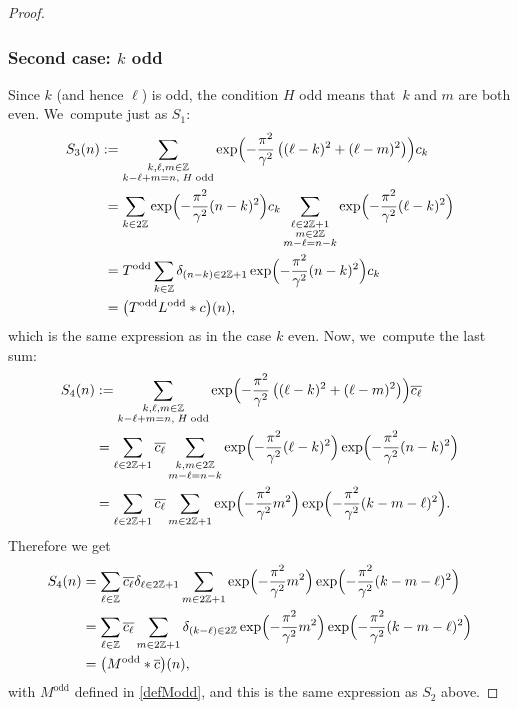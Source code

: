 \documentclass[10pt]{amsart}
\theoremstyle{definition}
\let\EE\exp
\let\ov\overline
\newcommand\Z{\mathbb Z}
\newcommand{\pa}[1]{\left(#1\right)}
\begin{document}
\begin{proof}
\subsubsection*{Second case: $k$ odd} Since $k$ (and hence $\ell$) is odd, the condition $H$ odd means that~$k$ and $m$ are both even. We~compute just as $S_1$:
\begin{align*}
S_3(n) &:= \sum_{\substack { k, \ell, m \in \Z \\ k-\ell+m=n, \;H\; \text{odd}}}\EE\Bigl(-\frac{\pi^2}{\gamma^2}\pa{(\ell-k)^2+(\ell-m)^2}\Bigr)c_{k} \\
&\hphantom{:}= \sum_{k\in 2\Z}\EE\Bigl(-\frac{\pi^2}{\gamma^2}(n-k)^2\Bigr)c_{k} \sum_{\substack {\ell \in 2\Z+1 \\ m \in 2\Z \\ m-\ell = n-k}}\EE\Bigl(-\frac{\pi^2}{\gamma^2}(\ell-k)^2\Bigr) \\
&\hphantom{:}= T^{\text{odd}}\sum_{k\in \Z}\delta_{(n-k)\in2\Z+1}\EE\Bigl(-\frac{\pi^2}{\gamma^2}(n-k)^2\Bigr)c_{k} \\
&\hphantom{:}= \bigl(T^{\text{odd}}L^{\text{odd}} * c\bigr)(n),
\end{align*}
which is the same expression as in the case $k$ even. Now, we~compute the last sum:
\begin{align*}
S_4(n) &:= \sum_{\substack {k, \ell, m \in \Z \\ k-\ell+m=n, \;H\; \text{odd}}}\EE\Bigl(-\frac{\pi^2}{\gamma^2}\pa{(\ell-k)^2+(\ell-m)^2}\Bigr)\ov{c_{\ell}} \\
&= \sum_{\ell\in 2\Z+1}\ov{c_{\ell}} \sum_{\substack {k,m \in 2\Z \\ m-\ell = n-k}}\EE\Bigl(-\frac{\pi^2}{\gamma^2}(\ell-k)^2\Bigr) \EE\Bigl(-\frac{\pi^2}{\gamma^2}(n-k)^2\Bigr) \\
&= \sum_{\ell\in 2\Z+1}\ov{c_{\ell}} \sum_{m \in 2\Z+1}\EE\Bigl(-\frac{\pi^2}{\gamma^2}m^2\Bigr) \EE\Bigl(-\frac{\pi^2}{\gamma^2}(k-m-\ell)^2\Bigr).
\end{align*}
Therefore we get
\begin{align*}
S_4(n) &= \sum_{\ell\in \Z}\ov{c_{\ell}}\delta_{\ell\in2\Z+1} \sum_{m \in 2\Z+1}\EE\Bigl(-\frac{\pi^2}{\gamma^2}m^2\Bigr)\EE\Bigl(-\frac{\pi^2}{\gamma^2}(k-m-\ell)^2\Bigr) \\
&= \sum_{\ell\in \Z}\ov{c_{\ell}} \sum_{m \in 2\Z+1}\delta_{(k-\ell)\in2\Z}\EE\Bigl(-\frac{\pi^2}{\gamma^2}m^2\Bigr) \EE\Bigl(-\frac{\pi^2}{\gamma^2}(k-m-\ell)^2\Bigr)\\
& =\bigl(M^{\text{odd}} * \overline{c}\bigr)(n),
\end{align*}
with $M^{\text{odd}}$ defined in \eqref{defModd}, and this is the same expression as $S_2$ above.


\end{proof}
\end{document}
